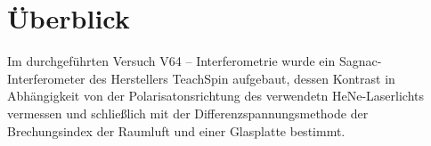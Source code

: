 

\section{Überblick}

Im durchgeführten Versuch V64 -- Interferometrie wurde ein Sagnac-Interferometer des Herstellers TeachSpin aufgebaut, dessen Kontrast in Abhängigkeit von der Polarisatonsrichtung des verwendetn HeNe-Laserlichts vermessen und schließlich mit der Differenzspannungsmethode der Brechungsindex der Raumluft und einer Glasplatte bestimmt.
